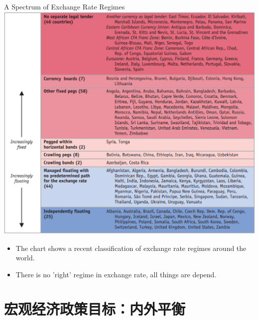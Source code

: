 \documentclass[10pt,hyperref={CJKbookmarks=true},xcolor=dvipsnames,aspectratio=169]{beamer}
\begin{document}
\begin{frame}{A Spectrum of Exchange Rate Regimes }
\centering
\includegraphics[scale=0.28]{fig/systems/spectrum}
\begin{itemize}
	\item The chart shows
	a recent classification of exchange rate regimes around the
	world.
	\item There is no 'right' regime in exchange rate, all things are depend.
\end{itemize}
\end{frame}

\section{宏观经济政策目标：内外平衡}
\end{document}
